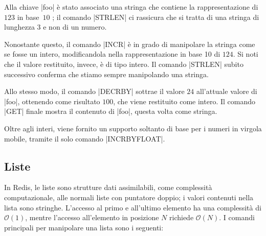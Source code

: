 Alla chiave \cverb|foo| è stato associato una stringa che contiene la rappresentazione di $123$
in base~$10$ ; il comando \cverb|STRLEN| ci rassicura che si tratta di una stringa di
lunghezza $3$ e non di un numero.

Nonostante questo, il comando \cverb|INCR|  è in grado di manipolare la stringa come
se fosse un intero, modificandola nella rappresentazione in base 10 di $124$. Si noti che il
valore restituito, invece, è di tipo intero. Il comando \cverb|STRLEN| subito successivo conferma
che stiamo sempre manipolando una stringa.

Allo stesso modo, il comando \cverb|DECRBY|  sottrae il valore $24$ all'attuale valore
di \cverb|foo|, ottenendo come risultato $100$, che viene restituito come intero. Il comando
\cverb|GET| finale mostra il contenuto di \cverb|foo|, questa volta come stringa.

Oltre agli interi, viene fornito un supporto soltanto di base per i numeri in virgola
mobile, tramite il solo comando \cverb|INCRBYFLOAT|. 

\subsection{Liste}

In Redis, le liste sono strutture dati assimilabili, come complessità computazionale, alle normali
liste con puntatore doppio; i valori contenuti nella lista sono stringhe. L'accesso al primo e
all'ultimo elemento ha una complessità di $\mathcal{O}(1)$, mentre l'accesso all'elemento in
posizione $N$ richiede $\mathcal{O}(N)$. I comandi principali per manipolare una lista sono i
seguenti:

